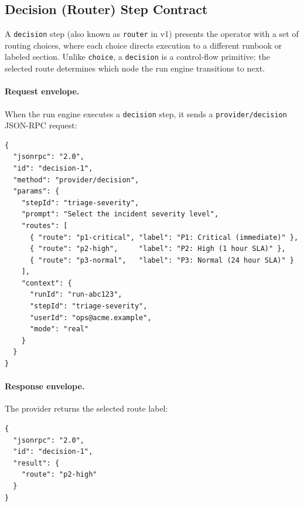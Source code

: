 \subsection{Decision (Router) Step Contract}
\label{subsec:decision-contract}

A \texttt{decision} step (also known as \texttt{router} in v1) presents the
operator with a set of routing choices, where each choice directs execution to
a different runbook or labeled section.  Unlike \texttt{choice}, a
\texttt{decision} is a control-flow primitive: the selected route determines
which node the run engine transitions to next.

\paragraph{Request envelope.}
When the run engine executes a \texttt{decision} step, it sends a
\texttt{provider/decision} JSON-RPC request:

\begin{verbatim}
{
  "jsonrpc": "2.0",
  "id": "decision-1",
  "method": "provider/decision",
  "params": {
    "stepId": "triage-severity",
    "prompt": "Select the incident severity level",
    "routes": [
      { "route": "p1-critical", "label": "P1: Critical (immediate)" },
      { "route": "p2-high",     "label": "P2: High (1 hour SLA)" },
      { "route": "p3-normal",   "label": "P3: Normal (24 hour SLA)" }
    ],
    "context": {
      "runId": "run-abc123",
      "stepId": "triage-severity",
      "userId": "ops@acme.example",
      "mode": "real"
    }
  }
}
\end{verbatim}

\paragraph{Response envelope.}
The provider returns the selected route label:

\begin{verbatim}
{
  "jsonrpc": "2.0",
  "id": "decision-1",
  "result": {
    "route": "p2-high"
  }
}
\end{verbatim}

